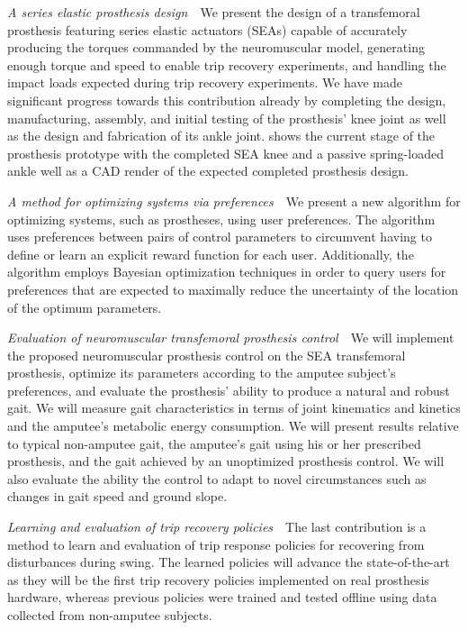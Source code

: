 \begin{contributions}
    \item\label{contrib:pros_design} \emph{A series elastic prosthesis
    design}~~We present the design of a transfemoral prosthesis featuring series
    elastic actuators (SEAs) capable of accurately producing the torques
    commanded by the neuromuscular model, generating enough torque and speed to
    enable trip recovery experiments, and handling the impact loads expected
    during trip recovery experiments. We have made significant progress towards
    this contribution already by completing the design, manufacturing, assembly,
    and initial testing of the prosthesis' knee joint as well as the design and
    fabrication of its ankle joint.   shows the
    current stage of the prosthesis prototype with the completed SEA knee and a
    passive spring-loaded ankle well as a CAD render of the expected completed
    prosthesis design.

    \item\label{contrib:pref_opt} \emph{A method for optimizing systems via
    preferences}~~We present a new algorithm for optimizing systems, such as
    prostheses, using user preferences.  The algorithm uses preferences between
    pairs of control parameters to circumvent having to define or learn an
    explicit reward function for each user. Additionally, the algorithm employs
    Bayesian optimization techniques in order to query users for preferences
    that are expected to maximally reduce the uncertainty of the location of the
    optimum parameters.

    \item\label{contrib:neuromuc_eval} \emph{Evaluation of neuromuscular
    transfemoral prosthesis control}~~We will implement the proposed
    neuromuscular prosthesis control on the SEA transfemoral prosthesis,
    optimize its parameters according to the amputee subject's preferences, and
    evaluate the prosthesis' ability to produce a natural and robust gait.  We
    will measure gait characteristics in terms of joint kinematics and kinetics
    and the amputee's metabolic energy consumption. We will present results
    relative to typical non-amputee gait, the amputee's gait using his or her
    prescribed prosthesis, and the gait achieved by an unoptimized prosthesis
    control. We will also evaluate the ability the control to adapt to novel
    circumstances such as changes in gait speed and ground slope. 

    \item\label{contrib:trip_recovery} \emph{Learning and evaluation of trip
    recovery policies}~~The last contribution is a method to learn and
    evaluation of trip response policies for recovering from disturbances during
    swing. The learned policies will advance the state-of-the-art as they will
    be the first trip recovery policies implemented on real prosthesis hardware,
    whereas previous policies were trained and tested offline using data
    collected from non-amputee subjects.
\end{contributions}
